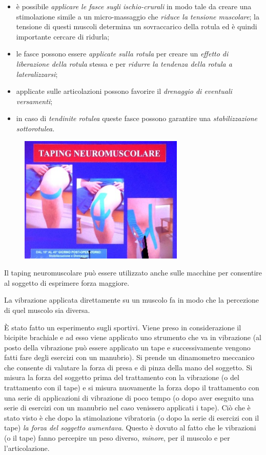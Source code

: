 \begin{itemize}
 
\item
  è possibile \emph{applicare le fasce sugli ischio-crurali} in modo
  tale da creare una stimolazione simile a un micro-massaggio che
  \emph{riduce la tensione muscolare}; la tensione di questi muscoli
  determina un sovraccarico della rotula ed è quindi importante cercare
  di ridurla;
\item 
  le fasce possono essere \emph{applicate sulla rotula} per creare un
  \emph{effetto di liberazione della rotula} stessa e per \emph{ridurre
  la tendenza della rotula a lateralizzarsi};
\item 
applicate
  sulle articolazioni possono favorire il \emph{drenaggio di eventuali
  versamenti};
\item 
  in caso di \emph{tendinite rotulea} queste fasce possono garantire una
  \emph{stabilizzazione sottorotulea.}
\end{itemize}
\begin{figure}[!ht]
\centering
	\includegraphics[width=0.7\textwidth]{030/image18.jpeg}
\end{figure}
Il taping neuromuscolare può essere utilizzato anche sulle macchine per
consentire al soggetto di esprimere forza maggiore.

La vibrazione applicata direttamente su un muscolo fa in modo che la
percezione di quel muscolo sia diversa.

È stato fatto un esperimento sugli sportivi. Viene preso in
considerazione il bicipite brachiale
e ad esso viene applicato uno strumento che va in vibrazione (al posto
della vibrazione può essere applicato un tape e successivamente vengono
fatti fare degli esercizi con un manubrio). Si prende un dinamometro
meccanico che consente di valutare la forza di presa e di pinza della
mano del soggetto. Si misura la forza del soggetto prima del trattamento
con la vibrazione (o del trattamento con il tape) e si misura nuovamente
la forza dopo il trattamento con una serie di applicazioni di vibrazione
di poco tempo (o dopo aver eseguito una serie di esercizi con un
manubrio nel caso venissero applicati i tape). Ciò che è stato visto è
che dopo la stimolazione vibratoria (o dopo la serie di esercizi con il
tape) \emph{la forza del soggetto aumentava}. Questo è dovuto al fatto
che le vibrazioni (o il tape) fanno percepire un peso diverso,
\emph{minore}, per il muscolo e per l'articolazione.

